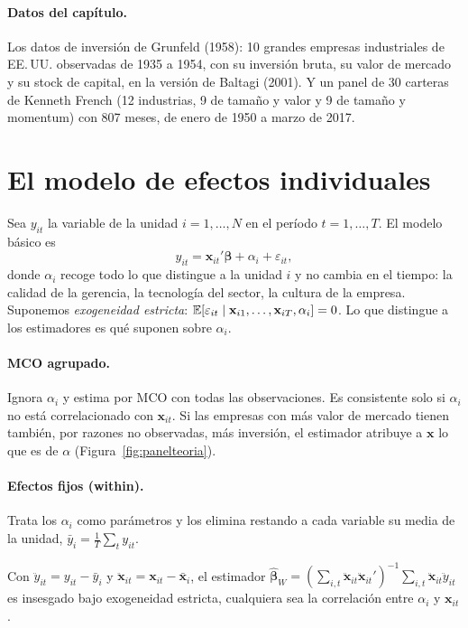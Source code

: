 \paragraph{Datos del capítulo.} Los datos de inversión de Grunfeld (1958): 10 grandes empresas industriales de EE.\,UU.
observadas de 1935 a 1954, con su inversión bruta, su valor de mercado y su stock de capital, en la versión de Baltagi
(2001). Y un panel de 30 carteras de Kenneth French (12 industrias, 9 de tamaño y valor y 9 de tamaño y momentum) con
807 meses, de enero de 1950 a marzo de 2017.

\section{El modelo de efectos individuales}

Sea $y_{it}$ la variable de la unidad $i=1,\dots,N$ en el período $t=1,\dots,T$. El modelo básico es
\[
  y_{it}=\mathbf x_{it}'\boldsymbol\beta+\alpha_i+\varepsilon_{it},
\]
donde $\alpha_i$ recoge todo lo que distingue a la unidad $i$ y no cambia en el tiempo: la calidad de la gerencia, la
tecnología del sector, la cultura de la empresa. Suponemos \emph{exogeneidad estricta}: $\mathbb{E}[\varepsilon_{it}\mid\mathbf
x_{i1},\dots,\mathbf x_{iT},\alpha_i]=0$. Lo que distingue a los estimadores es qué suponen sobre $\alpha_i$.

\paragraph{MCO agrupado.} Ignora $\alpha_i$ y estima por MCO con todas las observaciones. Es consistente solo si
$\alpha_i$ no está correlacionado con $\mathbf x_{it}$. Si las empresas con más valor de mercado tienen también, por
razones no observadas, más inversión, el estimador atribuye a $\mathbf x$ lo que es de $\alpha$ (Figura~\ref{fig:panelteoria}).

\paragraph{Efectos fijos (within).} Trata los $\alpha_i$ como parámetros y los elimina restando a cada variable su
media de la unidad, $\bar y_i=\frac1T\sum_ty_{it}$.

\begin{proposicion}\label{prop:within}
Con $\ddot y_{it}=y_{it}-\bar y_i$ y $\ddot{\mathbf x}_{it}=\mathbf x_{it}-\bar{\mathbf x}_i$, el estimador
$\hat{\boldsymbol\beta}_W=(\sum_{i,t}\ddot{\mathbf x}_{it}\ddot{\mathbf x}_{it}')^{-1}\sum_{i,t}\ddot{\mathbf x}_{it}\ddot y_{it}$ es
insesgado bajo exogeneidad estricta, cualquiera sea la correlación entre $\alpha_i$ y $\mathbf x_{it}$.
\end{proposicion}

